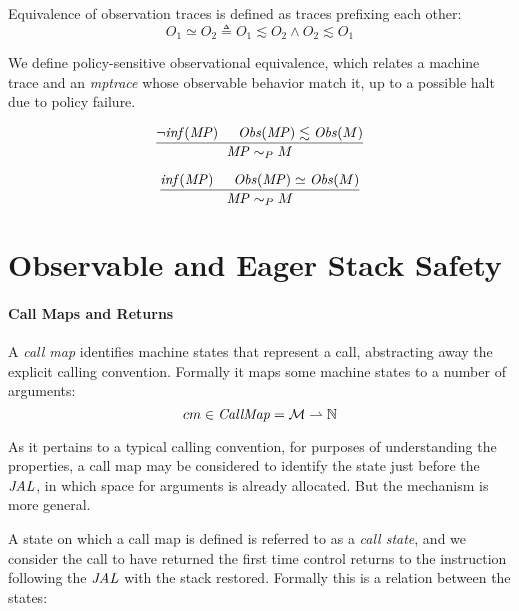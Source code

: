\documentclass[conference]{IEEEtran}
\begin{document}
    
    Equivalence of observation traces is defined as traces prefixing each other:
    \[O_1 \simeq O_2 \triangleq O_1 \lesssim O_2 \land O_2 \lesssim O_1\]
    

    We define policy-sensitive observational equivalence, which relates a machine trace and
    an {\it mptrace} whose observable behavior match it, up to a possible halt due to policy failure.

    \[\frac{\neg \mathit{inf}(\mathit{MP}) \hspace{.5cm} \mathit{Obs}(\mathit{MP}) \lesssim \mathit{Obs}(M)}
           {\mathit{MP} \sim_P M}\]
    
    \[\frac{\mathit{inf}(\mathit{MP}) \hspace{.5cm} \mathit{Obs}(\mathit{MP}) \simeq \mathit{Obs}(M)}
           {\mathit{MP} \sim_P M}\]

    
  \section{Observable and Eager Stack Safety}

    \paragraph*{Call Maps and Returns}

    A {\it call map} identifies machine states that represent a call, abstracting away the explicit
    calling convention. Formally it maps some machine states to a number of arguments:
    \[cm \in \mathit{CallMap} = {\mathcal M} \rightharpoonup \mathbb{N}\]

    As it pertains to a typical calling convention, for purposes of understanding the properties,
    a call map may be considered to identify the state just before the \(\mathit{JAL}\), in which space for
    arguments is already allocated. But the mechanism is more general.

    A state on which a call map is defined is referred to as a {\it call state}, and we consider
    the call to have returned the first time control returns to the instruction following the
    \(\mathit{JAL}\) with the stack restored. Formally this is a relation between the states:
    
\end{document}
